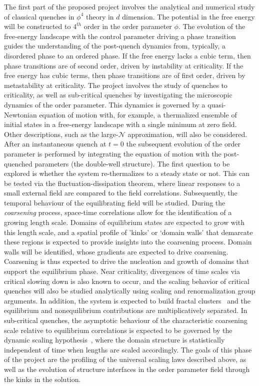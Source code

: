 \documentclass[a4paper,11pt,color]{article}
\begin{document}
\begin{enumerate}[label=(\alph*)]
The first part of the proposed project involves the analytical and numerical study of classical quenches in $\phi^4$ theory in  {$d$} 
dimension. The potential in the free energy will be constructed to $4^{th}$ order in the order parameter $\phi$. The evolution of the free-energy landscape with the control parameter driving a phase transition guides the understanding of the post-quench dynamics from, typically, a disordered phase to an ordered phase. If the free energy lacks a cubic term, then phase transitions are of second order, driven by instability at criticality. If the free energy has cubic terms, then phase transitions are of first order, driven by metastability at criticality. The project involves the study of quenches to criticality, as well as sub-critical quenches by investigating the microscopic dynamics of the order parameter. This dynamics is governed by a quasi-Newtonian equation of motion with,  {for example, 
a thermalized ensemble of initial states in a free-energy landscape with a single minimum at zero field}. Other descriptions, such as the 
large-$\mathcal{N}$ approximation, will also be considered. After an instantaneous quench at $t=0$ the subsequent evolution of the order parameter is performed by integrating the equation of motion with the post-quenched parameters  {(the double-well structure)}. The first question to be explored is whether the system re-thermalizes to a steady state or not. This can be tested via the fluctuation-dissipation theorem, where linear responses to a small external field are compared to the field correlations. Subsequently, the temporal behaviour of the equilibrating field will be studied. During the \textit{coarsening} process, space-time correlations allow for the identification of a growing length scale. Domains of equilibrium states are expected to grow with this length scale, and a spatial profile of 'kinks' or  {`domain walls'} that demarcate these regions is expected to provide insights into the coarsening process. Domain walls will be identified, whose gradients are expected to 
drive coarsening. Coarsening is thus expected to drive the nucleation and growth of domains that support the equilibrium phase. Near criticality, divergences of time scales via critical slowing down is also known to occur, and the scaling behavior of critical quenches will also be studied analytically using scaling and renormalization group arguments. In addition, the system is expected to build fractal clusters~\cite{fractal}
and the equilibrium and nonequilibrium contributions are multiplicatively separated. In sub-critical quenches, the asymptotic behaviour of the characteristic coarsening scale relative to equilibrium correlations is expected to be governed by the dynamic scaling hypothesis~\cite{dynscal}, where the domain structure is statistically independent of time when lengths are scaled accordingly. The goals of this phase of the project are the profiling of the universal scaling laws described above, as well as the evolution of structure interfaces in the order parameter field through the kinks in the solution.


\end{enumerate}
\end{document}
